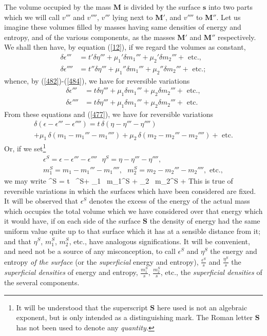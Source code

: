\documentclass[12pt]{article}
\newcommand{\dd}{\delta}
\begin{document}
{The volume occupied by the mass $\mathbf{M}$ is divided by the surface $\mathbf{s}$ into two parts which we will call $v'''$ and $v''''$, $v'''$ lying next to $\mathbf{M}'$, and $v''''$ to $\mathbf{M}''$. Let us imagine these volumes filled by masses having same densities of energy and entropy, and of the various components, as the masses $\mathbf{M}'$ and $\mathbf{M}''$ respectively. We shall then have, by equation (\ref{12}), if we regard the volumes as constant,
\begin{align}
\dd \epsilon''' &= t'\dd \eta''' + \mu_1' \dd m_1'''+ \mu_2' \dd m_2''' + \text{ etc.},  \label{485} \\
\dd \epsilon'''' &= t''\dd \eta''' + \mu_1'' \dd m_1'''+ \mu_2'' \dd m_2'''  + \text{ etc.}; \label{486} \end{align}
whence, by (\ref{482})-(\ref{484}), we have for reversible variations
\begin{align}
\dd \epsilon''' &= t\dd \eta''' + \mu_1 \dd m_1'''+ \mu_2 \dd m_2''' + \text{ etc.},  \label{487} \\
\dd \epsilon'''' &= t\dd \eta''' + \mu_1 \dd m_1'''+ \mu_2 \dd m_2''' +\text{ etc.}  \label{488} \end{align}
From these equations and (\ref{477}), we have for reversible variations
\begin{multline}
\dd(\epsilon-\epsilon'''-\epsilon'''') = t \, \dd(\eta-\eta'''-\eta'''') \\
+ \mu_1 \, \dd(m_1-m_1'''-m_1'''')+ \mu_2 \,\dd(m_2-m_2'''-m_2'''')+ \text{ etc.} \label{489} \end{multline}
Or, if we set\footnote{It will be understood that the superscript $\mathbf{S}$ here used is not an algebraic exponent, but is only intended as a distinguishing mark. The Roman letter $\mathbf{S}$ has not been used to denote any \textit{quantity.}}
\begin{gather}
\epsilon^S =\epsilon-\epsilon'''-\epsilon'''' \ \ \ \eta^ S=\eta-\eta'''-\eta'''',\label{490} \\
m_1^S = m_1-m_1'''-m_1'''', \ \ \ m_2^S = m_2-m_2'''-m_2'''', \text{ etc.}, \label{491} \end{gather}
we may write
\eqs \dd \epsilon^S = t \, \dd \eta^S+ \mu_1 \, \dd m_1^S + \mu_2 \, \dd m_2^S +    \label{492} \eqe
This is true of reversible variations in which the surfaces which have been considered are fixed. It will be observed that $\epsilon^S$ denotes the excess of the energy of the actual mass which occupies the total volume which we have considered over that energy which it would have, if on each side of the surface $\mathbf{S}$ the density of energy had the same uniform value quite up to that surface which it has at a sensible distance from it; and that $\eta^S$, $m_1^S$, $m_2^S$, etc., have analogous significations. It will be convenient, and need not be a source of any misconception, to call $\epsilon^S$ and $\eta^S$ the energy and entropy \textit{of the surface} (or the \textit{superficial} energy and entropy), $\frac{\epsilon^S}{s}$ and $\frac{\eta^S}{s}$ the \textit{superficial densities} of energy and entropy, $\frac{m_1^S}{s}$, $\frac{m_2^S}{s}$, etc., the \textit{superficial densities} of the several components.


}
\end{document}
